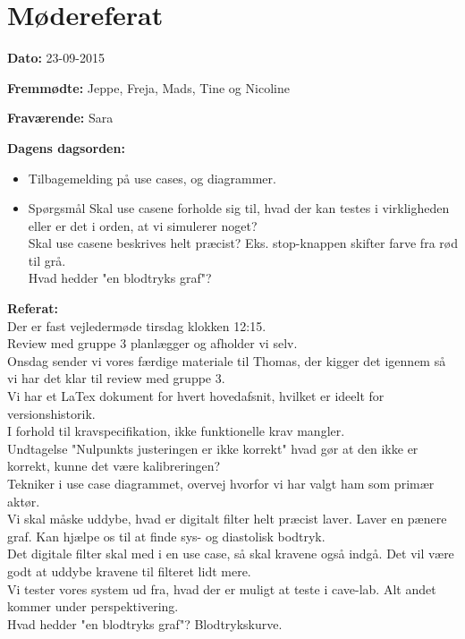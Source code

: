 \chapter{Mødereferat}

\textbf{Dato:} 23-09-2015

\textbf{Fremmødte:} Jeppe, Freja, Mads, Tine og Nicoline

\textbf{Fraværende:} Sara

\textbf{Dagens dagsorden:}
\begin{itemize}
	\item Tilbagemelding på use cases, og diagrammer.
	\item Spørgsmål
	\subitem Skal use casene forholde sig til, hvad der kan testes i virkligheden eller er det i orden, at vi simulerer noget?\\
	\subitem Skal use casene beskrives helt præcist? Eks. stop-knappen skifter farve fra rød til grå.\\
	\subitem Hvad hedder "en blodtryks graf"?\\
\end{itemize}

\textbf{Referat:}
\\Der er fast vejledermøde tirsdag klokken 12:15.
\\Review med gruppe 3 planlægger og afholder vi selv.
\\Onsdag sender vi vores færdige materiale til Thomas, der kigger det igennem så vi har det klar til review med gruppe 3.
\\Vi har et LaTex dokument for hvert hovedafsnit, hvilket er ideelt for versionshistorik.
\\I forhold til kravspecifikation, ikke funktionelle krav mangler.
\\Undtagelse "Nulpunkts justeringen er ikke korrekt" hvad gør at den ikke er korrekt, kunne det være kalibreringen?
\\Tekniker i use case diagrammet, overvej hvorfor vi har valgt ham som primær aktør.
\\Vi skal måske uddybe, hvad er digitalt filter helt præcist laver. Laver en pænere graf. Kan hjælpe os til at finde sys- og diastolisk bodtryk.
\\Det digitale filter skal med i en use case, så skal kravene også indgå. Det vil være godt at uddybe kravene til filteret lidt mere.
\\Vi tester vores system ud fra, hvad der er muligt at teste i cave-lab. Alt andet kommer under perspektivering. 
\\Hvad hedder "en blodtryks graf"? Blodtrykskurve.



